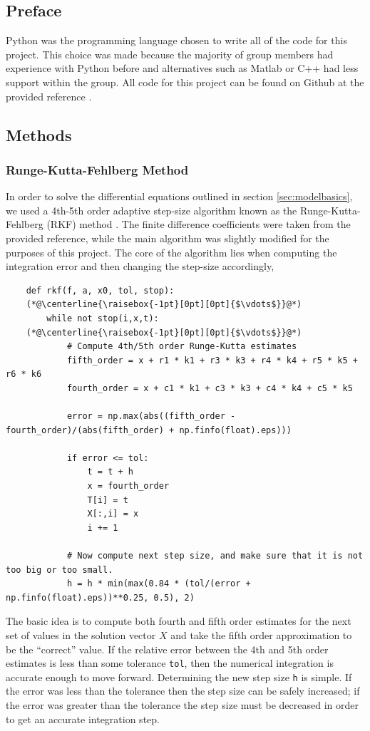 \documentclass[11pt]{article}
\begin{document}
    \subsection{Preface}
    Python was the programming language chosen to write all of the code for this project. This choice was made because the majority of group members had experience with Python before and alternatives such as Matlab or C++ had less support within the group. All code for this project can be found on Github at the provided reference \cite{githubcode}.
    \subsection{Methods}
    \subsubsection{Runge-Kutta-Fehlberg Method}
    \label{sec:rkf}
    In order to solve the differential equations outlined in section \ref{sec:modelbasics}, we used a 4th-5th order adaptive step-size algorithm known as the Runge-Kutta-Fehlberg (RKF) method \cite{rkf}. The finite difference coefficients were taken from the provided reference, while the main algorithm was slightly modified for the purposes of this project. The core of the algorithm lies when computing the integration error and then changing the step-size accordingly,
    \begin{lstlisting}
    def rkf(f, a, x0, tol, stop):
    (*@\centerline{\raisebox{-1pt}[0pt][0pt]{$\vdots$}}@*)
        while not stop(i,x,t):
    (*@\centerline{\raisebox{-1pt}[0pt][0pt]{$\vdots$}}@*)
            # Compute 4th/5th order Runge-Kutta estimates
            fifth_order = x + r1 * k1 + r3 * k3 + r4 * k4 + r5 * k5 + r6 * k6
            fourth_order = x + c1 * k1 + c3 * k3 + c4 * k4 + c5 * k5

            error = np.max(abs((fifth_order - fourth_order)/(abs(fifth_order) + np.finfo(float).eps)))

            if error <= tol:
                t = t + h
                x = fourth_order
                T[i] = t
                X[:,i] = x
                i += 1

            # Now compute next step size, and make sure that it is not too big or too small.
            h = h * min(max(0.84 * (tol/(error + np.finfo(float).eps))**0.25, 0.5), 2)
    \end{lstlisting}
    The basic idea is to compute both fourth and fifth order estimates for the next set of values in the solution vector $X$ and take the fifth order approximation to be the ``correct'' value. If the relative error between the 4th and 5th order estimates is less than some tolerance \lstinline{tol}, then the numerical integration is accurate enough to move forward. Determining the new step size \lstinline{h} is simple. If the error was less than the tolerance then the step size can be safely increased; if the error was greater than the tolerance the step size must be decreased in order to get an accurate integration step. \\
\end{document}
